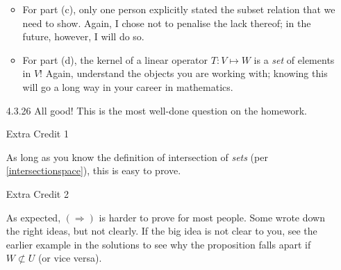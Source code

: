 \documentclass{amsart}
\theoremstyle{definition}
\theoremstyle{definition}
\DeclareMathOperator{\1}{\mathbbm{1}}
\begin{document}
\begin{enumerate}[itemsep = 2mm]
\begin{itemize}
		\item For part (c), only one person explicitly stated the subset relation that we need to show. Again, I chose not to penalise the lack thereof; in the future, however, I will do so.
		
		\item For part (d), the kernel of a linear operator $T: V \mapsto W$ is a \textit{set} of elements in $V$! Again, understand the objects you are working with; knowing this will go a long way in your career in mathematics.
	\end{itemize}
	
	
	
	
	\item[4.3.26] All good! This is the most well-done question on the homework.
	
	
	
	\item[Extra Credit 1] %
	
	As long as you know the definition of intersection of \textit{sets} (per \eqref{intersectionspace}), this is easy to prove.
	
	
	\item[Extra Credit 2] %
	
	As expected, $(\Rightarrow)$ is harder to prove for most people. Some wrote down the right ideas, but not clearly. If the big idea is not clear to you, see the earlier example in the solutions to see why the proposition falls apart if $W \not\subset U$ (or vice versa).
	
\end{enumerate}

	
\end{document}
